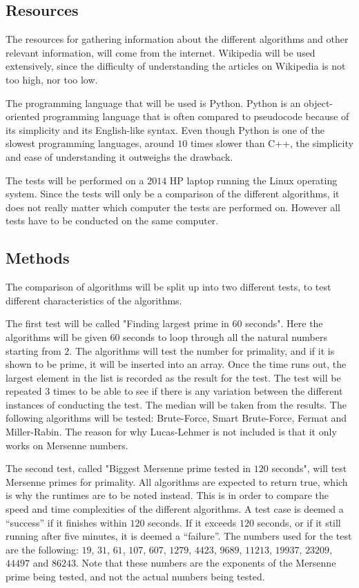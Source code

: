 \documentclass[main.tex]{subfiles}
\begin{document}
\subsection{Resources}
The resources for gathering information about the different algorithms and other
relevant information, will come from the internet. Wikipedia will be used
extensively, since the difficulty of understanding the articles on Wikipedia is
not too high, nor too low. \newline

The programming language that will be used is Python. Python is an
object-oriented programming language that is often compared to pseudocode
because of its simplicity and its English-like syntax. Even though Python is one
of the slowest programming languages, around $10$ times slower than C++, the
simplicity and ease of understanding it outweighs the drawback. \newline

The tests will be performed on a $2014$ HP laptop running the Linux operating
system. Since the tests will only be a comparison of the different algorithms,
it does not really matter which computer the tests are performed on. However all
tests have to be conducted on the same computer.

\subsection{Methods}
The comparison of algorithms will be split up into two different tests, to test
different characteristics of the algorithms. \newline

The first test will be called "Finding largest prime in $60$ seconds". Here the
algorithms will be given $60$ seconds to loop through all the natural numbers
starting from $2$. The algorithms will test the number for primality, and if it
is shown to be prime, it will be inserted into an array. Once the time runs out,
the largest element in the list is recorded as the result for the test. The test
will be repeated $3$ times to be able to see if there is any variation between
the different instances of conducting the test. The median will be taken from
the results. The following algorithms will be tested: Brute-Force, Smart
Brute-Force, Fermat and Miller-Rabin. The reason for why Lucas-Lehmer is not
included is that it only works on Mersenne numbers. \newline

The second test, called "Biggest Mersenne prime tested in $120$ seconds", will
test Mersenne primes for primality. All algorithms are expected to return true,
which is why the runtimes are to be noted instead. This is in order to compare
the speed and time complexities of the different algorithms. A test case is
deemed a ``success'' if it finishes within $120$ seconds. If it exceeds $120$
seconds, or if it still running after five minutes, it is deemed a ``failure''.
The numbers used for the test are the following: $19$, $31$, $61$, $107$, $607$,
$1279$, $4423$, $9689$, $11213$, $19937$, $23209$, $44497$ and $86243$. Note
that these numbers are the exponents of the Mersenne prime being tested, and not
the actual numbers being tested. \\
\end{document}
